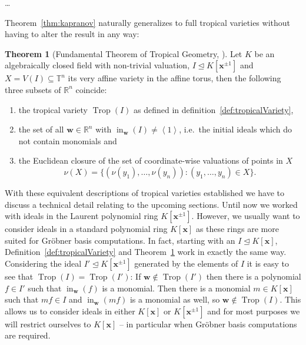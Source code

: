 \documentclass[
  paper=a4,
  titlepage,
  bibliography=totoc,
  listof=totoc,
  pagesize=pdftex
]{scrartcl}
\numberwithin{figure}{section}
\numberwithin{equation}{section}
\numberwithin{table}{section}
\newcommand*\setR{\mathds{R}}
\newcommand*\setT{\mathds{T}}
\newcommand*\ideal[1]{\left\langle #1 \right\rangle}
\let\vec\mathbf
\let\idealof\trianglelefteq
\DeclareMathOperator{\Trop}{Trop}
\DeclareMathOperator{\initial}{in}
\theoremstyle{definition}
\newtheorem{theorem}[definition]{Theorem}
\numberwithin{definition}{section}
\begin{document}
\dots %

Theorem~\ref{thm:kapranov} naturally generalizes to full tropical varieties without having
to alter the result in any way:

\begin{theorem}[Fundamental Theorem of Tropical Geometry,
  {\cite[Theorem~3.2.5]{sturmMacTrop}}] \label{thm:fundamentalThm}
  Let $K$ be an algebraically closed field with non-trivial valuation, $I \idealof K[\vec
  x^{\pm1}]$ and $X = V(I) \subseteq \setT^n$ its very affine variety in the affine torus,
  then the following three subsets of $\setR^n$ coincide:
  \begin{enumerate}
    \item the tropical variety $\Trop(I)$ as defined in
      definition~\ref{def:tropicalVariety},
    \item the set of all $\vec w \in \setR^n$ with $\initial_{\vec w}(I) \neq \ideal1$,
      i.e.\ the initial ideals which do not contain monomials and
    \item \label{thm:fund:val}
      the Euclidean closure of the set of coordinate-wise valuations of points in $X$
      \[
        \nu(X) = \{ (\nu(y_1), \dots, \nu(y_n)) : (y_1, \dots, y_n) \in X \}.
      \]
  \end{enumerate}
\end{theorem}

With these equivalent descriptions of tropical varieties established we have to discuss a
technical detail relating to the upcoming sections. Until now we worked with ideals in the
Laurent polynomial ring $K[\vec x^{\pm1}]$. However, we usually want to consider ideals in
a standard polynomial ring $K[\vec x]$ as these rings are more suited for Gröbner basis
computations. In fact, starting with an $I \idealof K[\vec x]$,
Definition~\ref{def:tropicalVariety} and Theorem~\ref{thm:fundamentalThm} work in exactly
the same way. Considering the ideal $I' \idealof K[\vec x^{\pm1}]$ generated by the
elements of $I$ it is easy to see that $\Trop(I) = \Trop(I')$: If $\vec w \not\in
\Trop(I')$ then there is a polynomial $f \in I'$ such that $\initial_{\vec w}(f)$ is a
monomial. Then there is a monomial $m \in K[\vec x]$ such that $mf \in I$ and
$\initial_{\vec w}(mf)$ is a monomial as well, so $\vec w \not\in \Trop(I)$. This allows
us to consider ideals in either $K[\vec x]$ or $K[\vec x^{\pm1}]$ and for most purposes we
will restrict ourselves to $K[\vec x]$ -- in particular when Gröbner basis computations
are required.

\end{document}
